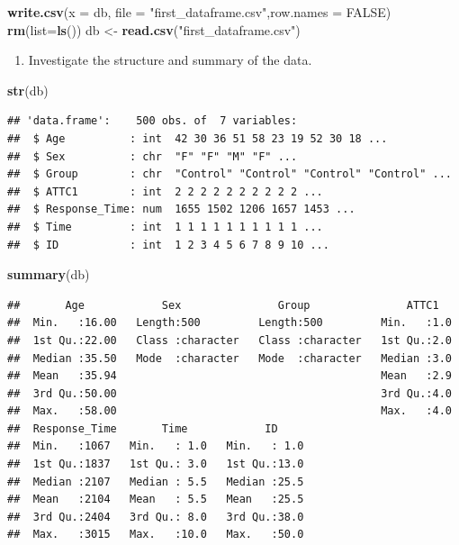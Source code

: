 \documentclass[
]{article}
\newenvironment{Shaded}{\begin{snugshade}}{\end{snugshade}}
\newcommand{\AttributeTok}[1]{\textcolor[rgb]{0.13,0.29,0.53}{#1}}
\newcommand{\ConstantTok}[1]{\textcolor[rgb]{0.56,0.35,0.01}{#1}}
\newcommand{\FunctionTok}[1]{\textcolor[rgb]{0.13,0.29,0.53}{\textbf{#1}}}
\newcommand{\NormalTok}[1]{#1}
\newcommand{\OtherTok}[1]{\textcolor[rgb]{0.56,0.35,0.01}{#1}}
\newcommand{\StringTok}[1]{\textcolor[rgb]{0.31,0.60,0.02}{#1}}
\providecommand{\tightlist}{%
  \setlength{\itemsep}{0pt}\setlength{\parskip}{0pt}}
\begin{document}
\begin{Shaded}
\begin{Highlighting}[]
\FunctionTok{write.csv}\NormalTok{(}\AttributeTok{x =}\NormalTok{ db, }\AttributeTok{file =} \StringTok{"first\_dataframe.csv"}\NormalTok{,}\AttributeTok{row.names =} \ConstantTok{FALSE}\NormalTok{)}
\FunctionTok{rm}\NormalTok{(}\AttributeTok{list=}\FunctionTok{ls}\NormalTok{())}
\NormalTok{db }\OtherTok{\textless{}{-}} \FunctionTok{read.csv}\NormalTok{(}\StringTok{"first\_dataframe.csv"}\NormalTok{)}
\end{Highlighting}
\end{Shaded}

\begin{enumerate}
\def\labelenumi{\alph{enumi}.}
\setcounter{enumi}{2}
\tightlist
\item
  Investigate the structure and summary of the data.
\end{enumerate}

\begin{Shaded}
\begin{Highlighting}[]
\FunctionTok{str}\NormalTok{(db) }
\end{Highlighting}
\end{Shaded}

\begin{verbatim}
## 'data.frame':    500 obs. of  7 variables:
##  $ Age          : int  42 30 36 51 58 23 19 52 30 18 ...
##  $ Sex          : chr  "F" "F" "M" "F" ...
##  $ Group        : chr  "Control" "Control" "Control" "Control" ...
##  $ ATTC1        : int  2 2 2 2 2 2 2 2 2 2 ...
##  $ Response_Time: num  1655 1502 1206 1657 1453 ...
##  $ Time         : int  1 1 1 1 1 1 1 1 1 1 ...
##  $ ID           : int  1 2 3 4 5 6 7 8 9 10 ...
\end{verbatim}

\begin{Shaded}
\begin{Highlighting}[]
\FunctionTok{summary}\NormalTok{(db)}
\end{Highlighting}
\end{Shaded}

\begin{verbatim}
##       Age            Sex               Group               ATTC1    
##  Min.   :16.00   Length:500         Length:500         Min.   :1.0  
##  1st Qu.:22.00   Class :character   Class :character   1st Qu.:2.0  
##  Median :35.50   Mode  :character   Mode  :character   Median :3.0  
##  Mean   :35.94                                         Mean   :2.9  
##  3rd Qu.:50.00                                         3rd Qu.:4.0  
##  Max.   :58.00                                         Max.   :4.0  
##  Response_Time       Time            ID      
##  Min.   :1067   Min.   : 1.0   Min.   : 1.0  
##  1st Qu.:1837   1st Qu.: 3.0   1st Qu.:13.0  
##  Median :2107   Median : 5.5   Median :25.5  
##  Mean   :2104   Mean   : 5.5   Mean   :25.5  
##  3rd Qu.:2404   3rd Qu.: 8.0   3rd Qu.:38.0  
##  Max.   :3015   Max.   :10.0   Max.   :50.0
\end{verbatim}
\end{document}
